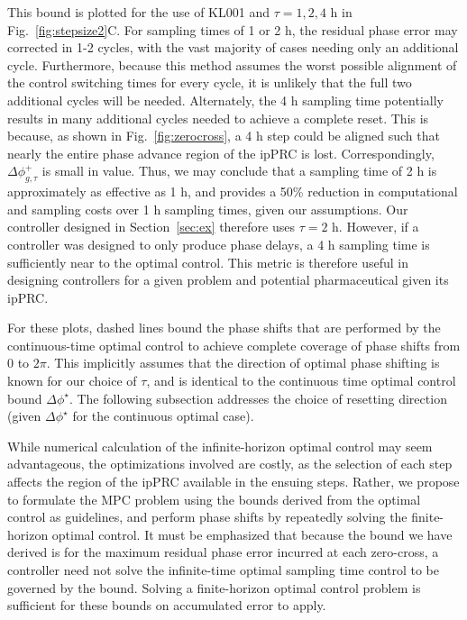 This bound is plotted for the use of KL001 and $\tau = 1,2,4$ h in Fig.~\ref{fig:stepsize2}C.
For sampling times of 1 or 2 h, the residual phase error may corrected in 1-2 cycles, with the vast majority of cases needing only an additional cycle.
Furthermore, because this method assumes the worst possible alignment of the control switching times for every cycle, it is unlikely that the full two additional cycles will be needed.
Alternately, the 4 h sampling time potentially results in many additional cycles needed to achieve a complete reset.
This is because, as shown in Fig.~\ref{fig:zerocross}, a 4 h step could be aligned such that nearly the entire phase advance region of the ipPRC is lost.
Correspondingly, $\Delta\phi^+_{g,\tau}$ is small in value.
Thus, we may conclude that a sampling time of 2 h is approximately as effective as 1 h, and provides a 50\% reduction in computational and sampling costs over 1 h sampling times, given our assumptions.
Our controller designed in Section~\ref{sec:ex} therefore uses $\tau=2$ h.
However, if a controller was designed to only produce phase delays, a 4 h sampling time is sufficiently near to the optimal control.
This metric is therefore useful in designing controllers for a given problem and potential pharmaceutical given its ipPRC.

For these plots, dashed lines bound the phase shifts that are performed by the continuous-time optimal control to achieve complete coverage of phase shifts from 0 to $2\pi$.
This implicitly assumes that the direction of optimal phase shifting is known for our choice of $\tau$, and is identical to the continuous time optimal control bound $\Delta\phi^\star$.
The following subsection addresses the choice of resetting direction (given $\Delta\phi^\star$ for the continuous optimal case).

While numerical calculation of the infinite-horizon optimal control may seem advantageous, the optimizations involved are costly, as the selection of each step affects the region of the ipPRC available in the ensuing steps.
Rather, we propose to formulate the MPC problem using the bounds derived from the optimal control as guidelines, and perform phase shifts by repeatedly solving the finite-horizon optimal control.
It must be emphasized that because the bound we have derived is for the maximum residual phase error incurred at each zero-cross, a controller need not solve the infinite-time optimal sampling time control to be governed by the bound.
Solving a finite-horizon optimal control problem is sufficient for these bounds on accumulated error to apply.


